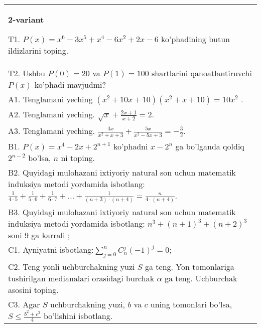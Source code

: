 \documentclass{article}
\begin{document}
\begin{tabular}{m{17cm}}
\textbf{2-variant}
\newline

T1. \(P(x) = x^{6} - 3x^{5} + x^{4} - 6x^{2} + 2x - 6\) ko'phadining butun ildizlarini toping. \\
T2. Ushbu \(P(0) = 20\) va \(P(1) = 100\) shartlarini qanoatlantiruvchi \(P(x)\) ko'phadi mavjudmi? \\
A1. Tenglamani yeching \(\left( x^{2} + 10x + 10 \right)\left( x^{2} + x + 10 \right) = 10x^{2}\) . \\
A2. Tenglamani yeching. \(\sqrt{x} + \frac{2x + 1}{x + 2} = 2\). \\
A3. Tenglamani yeching. \(\frac{4x}{x^{2} + x + 3} + \frac{5x}{x^{2} - 5x + 3} = - \frac{3}{2}\). \\
B1. \(P(x) = x^{4} - 2x + 2^{n + 1}\) ko'phadni \(x - 2^{n}\) ga bo'lganda qoldiq \(2^{n - 2}\) bo'lsa, \(n\) ni toping. \\
B2. Quyidagi mulohazani ixtiyoriy natural son uchun matematik induksiya metodi yordamida isbotlang: \(\frac{1}{4 \cdot 5} + \frac{1}{5 \cdot 6} + \frac{1}{6 \cdot 7} + \ldots + \frac{1}{(n + 3) \cdot (n + 4)} = \frac{n}{4 \cdot (n + 4)}\). \\
B3. Quyidagi mulohazani ixtiyoriy natural son uchun matematik induksiya metodi yordamida isbotlang: \(n^{3} + (n + 1)^{3} + (n + 2)^{3}\) soni 9 ga karrali ; \\
C1. Ayniyatni isbotlang:\(\sum_{j = 0}^{n}C_{n}^{j}( - 1)^{j} = 0\); \\
C2. Teng yonli uchburchakning yuzi \(S\) ga teng. Yon tomonlariga tushirilgan medianalari orasidagi burchak \(\alpha\) ga teng. Uchburchak asosini toping. \\
C3. Agar \(S\) uchburchakning yuzi, \(b\) va \(c\) uning tomonlari bo'lsa, \(S \leq \frac{b^{2} + c^{2}}{4}\) bo'lishini isbotlang. \\

\end{tabular}
\vspace{1cm}
\end{document}
